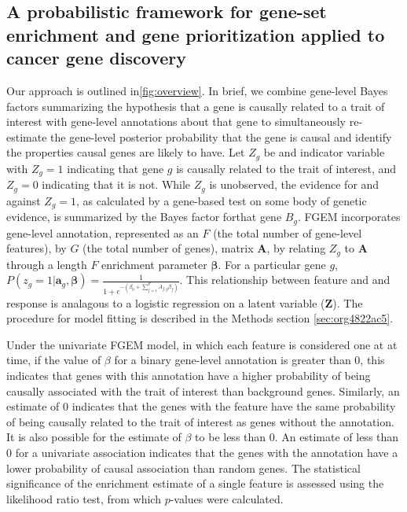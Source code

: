 \subsection{A probabilistic framework for gene-set enrichment and gene prioritization applied to cancer gene discovery}\label{sec:org2d4ff20}

Our approach is outlined in\ref{fig:overview}. In brief, we combine gene-level Bayes factors summarizing the hypothesis that a gene is causally related to a trait of interest with gene-level annotations about that gene to simultaneously re-estimate the gene-level posterior probability that the gene is causal and identify the properties causal genes are likely to have.  Let $Z_g$ be and indicator variable with $Z_g = 1$ indicating that gene $g$ is causally related to the trait of interest, and $Z_g = 0$ indicating that it is not.  While $Z_g$ is unobserved, the evidence for and against $Z_g=1$, as calculated by a gene-based test on some body of genetic evidence, is summarized by the Bayes factor forthat gene $B_g$.  FGEM incorporates gene-level annotation, represented as an $F$ (the total number of gene-level features), by $G$ (the total number of genes), matrix $\textbf{A}$, by relating $Z_g$ to $\textbf{A}$ through a length $F$  enrichment parameter $\boldsymbol{\beta}$.  For a particular gene $g$, $P(z_g=1|\textbf{a}_g,\boldsymbol{\beta}) =  \frac{1}{1+e^{-(\beta_{0}+\sum_{f=1}^F{A_{f,g}\beta_f})}} $.  This relationship between feature and and response is
analagous to a logistic regression on a latent variable ($\textbf{Z}$).  The procedure for model fitting is described in the Methods section \ref{sec:org4822ac5}.

Under the univariate FGEM model, in which each feature is considered one at at time, if the value of $\beta$ for a binary gene-level annotation is greater than $0$, this indicates that genes with this annotation have a higher probability of being causally associated with the trait of interest than background genes.  Similarly, an estimate of $0$ indicates that the genes with the feature have the same probability of being causally related to the trait of interest as genes without the annotation.  It is also possible for the estimate of $\beta$ to be less than $0$.  An estimate of less than 0 for a univariate association indicates that the genes with the annotation have a lower probability of causal association than random genes.  The statistical significance of the enrichment estimate of a single feature is assessed using the likelihood ratio test, from which $p$-values were calculated.

